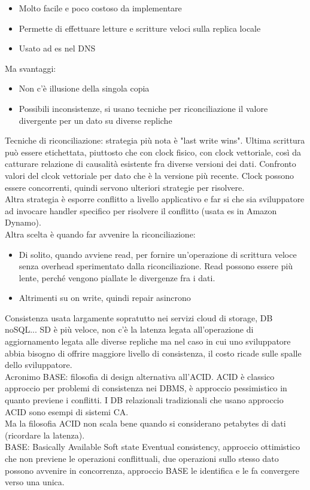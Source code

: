\documentclass{article}
\begin{document}
\begin{itemize}
\item Molto facile e poco costoso da implementare
\item Permette di effettuare letture e scritture veloci sulla replica locale
\item Usato ad es nel DNS
\end{itemize}
Ma svantaggi:
\begin{itemize}
\item Non c'è illusione della singola copia
\item Possibili inconsistenze, si usano tecniche per riconciliazione il valore divergente per un dato su diverse repliche
\end{itemize}
Tecniche di riconciliazione: strategia più nota è "last write wins". Ultima scrittura può essere etichettata, piuttosto che con clock fisico, con clock vettoriale, così da catturare relazione di causalità esistente fra diverse versioni dei dati. Confronto valori del clcok vettoriale per dato che è la versione più recente. Clock possono essere concorrenti, quindi servono ulteriori strategie per risolvere.\\ Altra strategia è esporre conflitto a livello applicativo e far si che sia sviluppatore ad invocare handler specifico per risolvere il conflitto (usata es in Amazon Dynamo).\\ Altra scelta è quando far avvenire la riconciliazione:
\begin{itemize}
\item Di solito, quando avviene read, per fornire un'operazione di scrittura veloce senza overhead sperimentato dalla riconciliazione. Read possono essere più lente, perché vengono piallate le divergenze fra i dati.
\item Altrimenti su on write, quindi repair asincrono
\end{itemize}
Consistenza usata largamente sopratutto nei servizi cloud di storage, DB noSQL... SD è più veloce, non c'è la latenza legata all'operazione di aggiornamento legata alle diverse repliche ma nel caso in cui uno sviluppatore abbia bisogno di offrire maggiore livello di consistenza, il costo ricade sulle spalle dello sviluppatore.\\ Acronimo BASE: filosofia di design alternativa all'ACID. ACID è classico approccio  per problemi di consistenza nei DBMS, è approccio pessimistico in quanto previene i conflitti. I DB relazionali tradizionali che usano approccio ACID sono esempi di sistemi CA.\\ Ma la filosofia ACID non scala bene quando si considerano petabytes di dati (ricordare la latenza).\\ BASE: Basically Available Soft state Eventual consistency, approccio ottimistico che non previene le operazioni conflittuali, due operazioni sullo stesso dato possono avvenire in concorrenza, approccio BASE le identifica e le fa convergere verso una unica.\\
\end{document}
